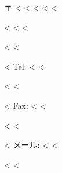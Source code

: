 〒 <%
<%
<%
<%
<%

\vspace{.5cm}
<%
<%
<%

<%
\hspace{0.1cm} 
<%

<%
Tel: <%
<%

<%
\hspace{0.1cm}
<%

<%
Fax: <%
<%

<%
\hspace{0.1cm}
<%

<%
メール: <%
<%

<%
\hspace{0.1}
<%